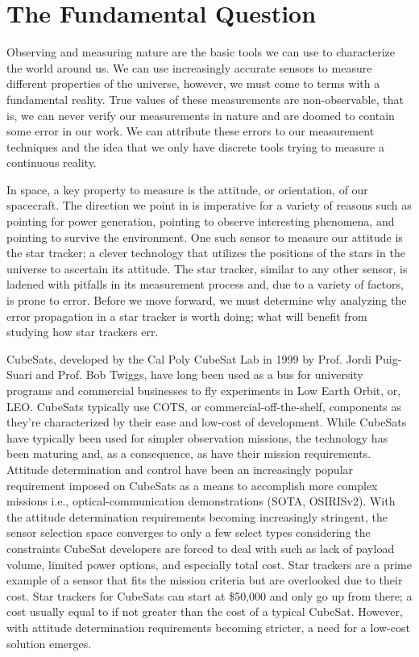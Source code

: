 \section{The Fundamental Question}

\par \qquad Observing and measuring nature are the basic tools we can use to characterize the world around us.
We can use increasingly accurate sensors to measure different properties of the universe, however, we must come to terms with a fundamental reality.
True values of these measurements are non-observable, that is, we can never verify our measurements in nature and are doomed to contain some error in our work.
We can attribute these errors to our measurement techniques and the idea that we only have discrete tools trying to measure a continuous reality.

\par \qquad In space, a key property to measure is the attitude, or orientation, of our spacecraft.
The direction we point in is imperative for a variety of reasons such as pointing for power generation, pointing to observe interesting phenomena, and pointing to survive the environment.
One such sensor to measure our attitude is the star tracker; a clever technology that utilizes the positions of the stars in the universe to ascertain its attitude.
The star tracker, similar to any other sensor, is ladened with pitfalls in its measurement process and, due to a variety of factors, is prone to error.
Before we move forward, we must determine why analyzing the error propagation in a star tracker is worth doing; what will benefit from studying how star trackers err.

\par \qquad CubeSats, developed by the Cal Poly CubeSat Lab in 1999 by Prof. Jordi Puig-Suari and Prof. Bob Twiggs, have long been used as a bus for university programs and commercial businesses to fly experiments in Low Earth Orbit, or, LEO.
CubeSats typically use COTS, or commercial-off-the-shelf, components as they're characterized by their ease and low-cost of development.
While CubeSats have typically been used for simpler observation missions, the technology has been maturing and, as a consequence, as have their mission requirements.
Attitude determination and control have been an increasingly popular requirement imposed on CubeSats as a means to accomplish more complex missions i.e., optical-communication demonstrations (SOTA, OSIRISv2)\cite{OpticalCommsInSpace}.
With the attitude determination requirements becoming increasingly stringent, the sensor selection space converges to only a few select types considering the constraints CubeSat developers are forced to deal with such as lack of payload volume, limited power options, and especially total cost.
Star trackers are a prime example of a sensor that fits the mission criteria but are overlooked due to their cost.
Star trackers for CubeSats can start at \$50,000 and only go up from there; a cost usually equal to if not greater than the cost of a typical CubeSat.
However, with attitude determination requirements becoming stricter, a need for a low-cost solution emerges.

